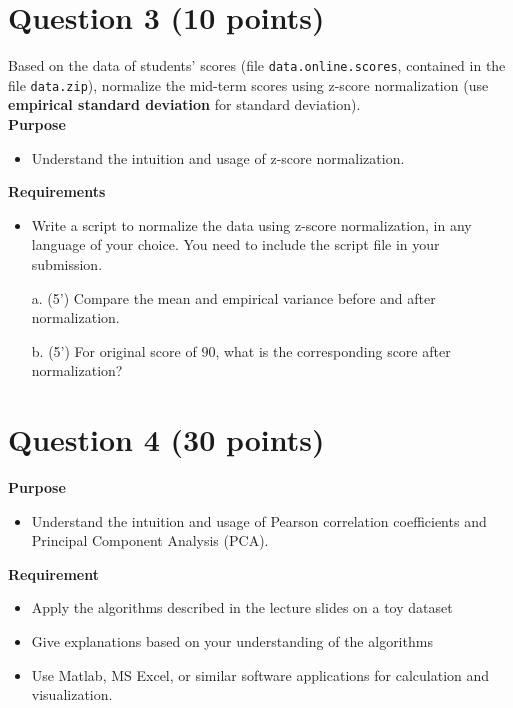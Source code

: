 \pagebreak



\section*{Question 3 (10 points)}
Based on the data of students' scores (file \texttt{data.online.scores}, contained in the file \texttt{data.zip}), normalize the mid-term scores using z-score normalization (use \textbf{empirical standard deviation} for standard deviation).\\

\textbf{Purpose} 
\begin{itemize}
\item Understand the intuition and usage of z-score normalization.
\end{itemize}

\textbf{Requirements}
\begin{itemize}
\item Write a script to normalize the data using z-score normalization, in any language of your choice. You need to include the script file in your submission.
\end{itemize}

\begin{itemize}
\item[a.] (5') Compare the mean and empirical variance before and after normalization.
\item[b.] (5') For original score of $90$, what is the corresponding score after normalization?
\end{itemize}

\section*{Question 4 (30 points)}
\textbf{Purpose}
\begin{itemize}
\item Understand the intuition and usage of Pearson correlation coefficients and Principal Component Analysis (PCA).
\end{itemize}

\textbf{Requirement}
\begin{itemize}
\item Apply the algorithms described in the lecture slides on a toy dataset
\item Give explanations based on your understanding of the algorithms
\item Use Matlab, MS Excel, or similar software applications for calculation and visualization.
\end{itemize}

